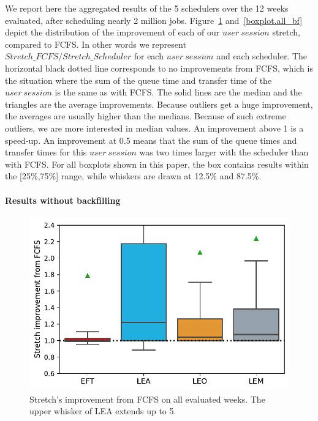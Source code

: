 \documentclass[conference]{IEEEtran}
\newcommand{\us}{\ensuremath{\mathit{user~session}}\xspace}
\begin{document}
We report here the aggregated results of the 5 schedulers over the 12 weeks evaluated, after scheduling nearly 2 million jobs.
Figure~\ref{boxplot.all} and~\ref{boxplot.all_bf} depict 
the distribution of the improvement of each of our \us stretch, compared to FCFS.
In other words we represent $\mathit{Stretch\_FCFS}/\mathit{Stretch\_Scheduler}$ for each \us and each scheduler.
The horizontal black dotted line corresponds to no improvements from FCFS, which
is the situation where the sum of the queue time and transfer time of the \us is the same as with FCFS.
The solid lines are the median and the triangles are the average
improvements.
Because outliers get a huge improvement, the averages are usually higher than the medians.
Because of such extreme outliers, we are more interested in median values.
An improvement above 1 is a speed-up. An improvement at 0.5 means that
the sum of the queue times and transfer times for this \us was two
times larger with the scheduler than with FCFS.
For all boxplots shown in this paper, the box contains results within
the [25\%,75\%] range, while whiskers are drawn at 12.5\% and 87.5\%.


\paragraph{Results without backfilling}

\begin{figure}[t]\centering\includegraphics[width=0.9\linewidth]{../MBSS/plot/Boxplot/byuser/box_plot_stretch_all-all_1.pdf}\caption{Stretch's improvement from FCFS on all evaluated weeks. The upper whisker of LEA extends up to 5.}\label{boxplot.all}\end{figure}
\end{document}
